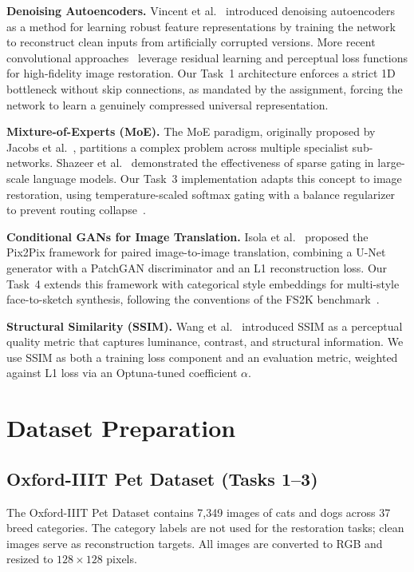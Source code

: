 \documentclass[conference]{IEEEtran}
\begin{document}
\textbf{Denoising Autoencoders.} Vincent et al.~\cite{vincent2008extracting} introduced denoising autoencoders as a method for learning robust feature representations by training the network to reconstruct clean inputs from artificially corrupted versions. More recent convolutional approaches~\cite{zhang2017beyond, mao2016image} leverage residual learning and perceptual loss functions for high-fidelity image restoration. Our Task~1 architecture enforces a strict 1D bottleneck without skip connections, as mandated by the assignment, forcing the network to learn a genuinely compressed universal representation.

\textbf{Mixture-of-Experts (MoE).} The MoE paradigm, originally proposed by Jacobs et al.~\cite{jacobs1991adaptive}, partitions a complex problem across multiple specialist sub-networks. Shazeer et al.~\cite{shazeer2017outrageously} demonstrated the effectiveness of sparse gating in large-scale language models. Our Task~3 implementation adapts this concept to image restoration, using temperature-scaled softmax gating with a balance regularizer to prevent routing collapse~\cite{fedus2022switch}.

\textbf{Conditional GANs for Image Translation.} Isola et al.~\cite{isola2017image} proposed the Pix2Pix framework for paired image-to-image translation, combining a U-Net generator with a PatchGAN discriminator and an L1 reconstruction loss. Our Task~4 extends this framework with categorical style embeddings for multi-style face-to-sketch synthesis, following the conventions of the FS2K benchmark~\cite{fan2022facial}.

\textbf{Structural Similarity (SSIM).} Wang et al.~\cite{wang2004image} introduced SSIM as a perceptual quality metric that captures luminance, contrast, and structural information. We use SSIM as both a training loss component and an evaluation metric, weighted against L1 loss via an Optuna-tuned coefficient $\alpha$.

\section{Dataset Preparation}
\label{sec:dataset}

\subsection{Oxford-IIIT Pet Dataset (Tasks 1--3)}

The Oxford-IIIT Pet Dataset contains 7,349 images of cats and dogs across 37 breed categories. The category labels are not used for the restoration tasks; clean images serve as reconstruction targets. All images are converted to RGB and resized to $128 \times 128$ pixels.
\end{document}
